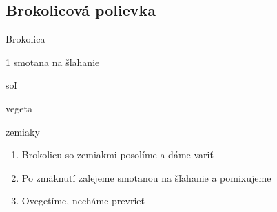\setcounter{step}{0}
\subsection{Brokolicová polievka}

\begin{ingredient}
\def\portions{4}%

\begin{main}
	\item Brokolica
	\item 1 smotana na šľahanie
	\item soľ
    \item vegeta
    \item zemiaky
	
\end{main}

\end{ingredient}
\begin{recipe}

\begin{enumerate}

\item{Brokolicu so zemiakmi posolíme a dáme variť}
\item{Po zmäknutí zalejeme smotanou na šľahanie a pomixujeme}
\item{Ovegetíme, necháme prevrieť}	

\end{enumerate}
\end{recipe}

\begin{notes}

\end{notes}
\clearpage	
